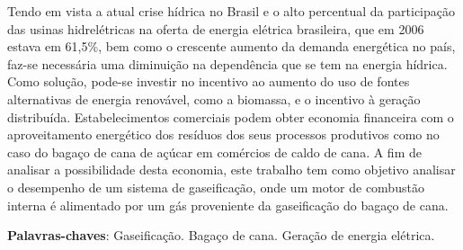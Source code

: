 \begin{resumo}

Tendo em vista a atual crise hídrica no Brasil e o alto percentual da participação das usinas hidrelétricas na oferta de energia elétrica brasileira, que em 2006 estava em 61,5\%, bem como o crescente aumento da demanda energética no país, faz-se necessária uma diminuição na dependência que se tem na energia hídrica. Como solução, pode-se investir no incentivo ao aumento do uso de fontes alternativas de energia renovável, como a biomassa, e o incentivo à geração distribuída. Estabelecimentos comerciais podem obter economia financeira com o aproveitamento energético dos resíduos dos seus processos produtivos como no caso do bagaço de cana de açúcar em comércios de caldo de cana. A fim de analisar a possibilidade desta economia, este trabalho tem como objetivo analisar o desempenho de um sistema de gaseificação, onde um motor de combustão interna é alimentado por um gás proveniente da gaseificação do bagaço de cana.

 \vspace{\onelineskip}
    
 \noindent
 \textbf{Palavras-chaves}: Gaseificação. Bagaço de cana. Geração de energia elétrica.
\end{resumo}
